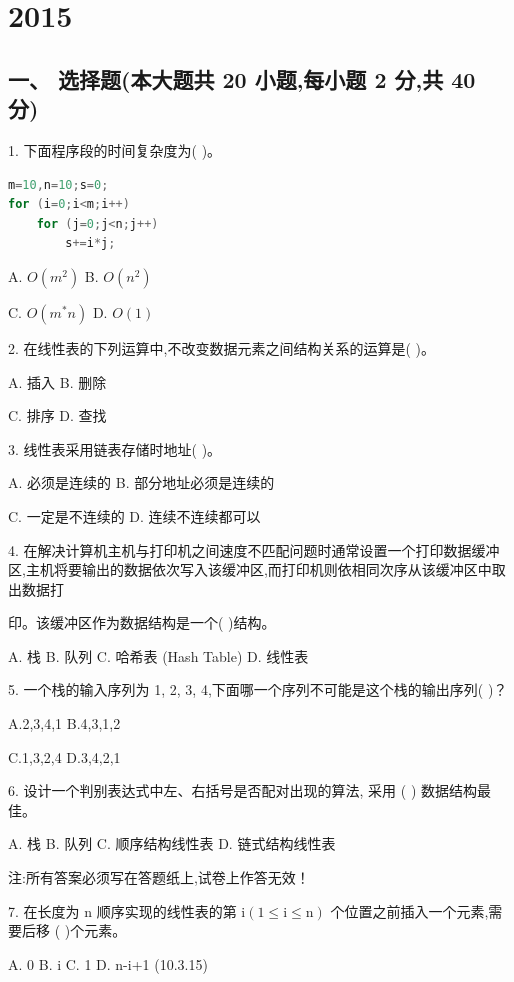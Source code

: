 \chapter{2015}
\section*{一、 选择题(本大题共 20 小题,每小题 2 分,共 40 分)}

1. 下面程序段的时间复杂度为(   )。

\begin{lstlisting}[language=C, basicstyle=\ttfamily]
m=10,n=10;s=0;
for (i=0;i<m;i++)
    for (j=0;j<n;j++)
        s+=i*j;
\end{lstlisting}

A. \(O\left( {m}^{2}\right)\) B. \(O\left( {n}^{2}\right)\)

C. \(O\left( {{m}^{ * }n}\right)\) D. \(O\left( 1\right)\)

2. 在线性表的下列运算中,不改变数据元素之间结构关系的运算是(   )。

A. 插入 B. 删除

C. 排序 D. 查找

3. 线性表采用链表存储时地址(   )。

A. 必须是连续的 B. 部分地址必须是连续的

C. 一定是不连续的 D. 连续不连续都可以

4. 在解决计算机主机与打印机之间速度不匹配问题时通常设置一个打印数据缓冲区,主机将要输出的数据依次写入该缓冲区,而打印机则依相同次序从该缓冲区中取出数据打

印。该缓冲区作为数据结构是一个(   )结构。

A. 栈 B. 队列 C. 哈希表 (Hash Table) D. 线性表

5. 一个栈的输入序列为 1, 2, 3, 4,下面哪一个序列不可能是这个栈的输出序列(   )？

A.2,3,4,1 B.4,3,1,2

C.1,3,2,4 D.3,4,2,1

6. 设计一个判别表达式中左、右括号是否配对出现的算法, 采用 (   ) 数据结构最佳。

A. 栈 B. 队列 C. 顺序结构线性表 D. 链式结构线性表

注:所有答案必须写在答题纸上,试卷上作答无效！

7. 在长度为 \(\mathrm{n}\) 顺序实现的线性表的第 \(\mathrm{i}\left( {1 \leq  \mathrm{i} \leq  \mathrm{n}}\right)\) 个位置之前插入一个元素,需要后移 (   )个元素。

A. 0 B. i C. 1 D. n-i+1 (10.3.15)

